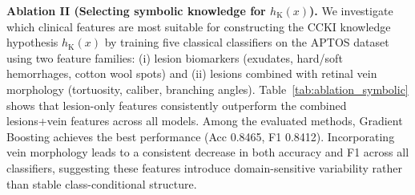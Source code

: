 \documentclass[runningheads]{llncs}
\begin{document}
\noindent\textbf{Ablation II (Selecting symbolic knowledge for $h_{\mathrm{K}}(x)$).}
\label{ablation_study1}
We investigate which clinical features are most suitable for constructing the CCKI knowledge hypothesis $h_{\mathrm{K}}(x)$ by training five classical classifiers on the APTOS dataset using two feature families: (i) lesion biomarkers (exudates, hard/soft hemorrhages, cotton wool spots) and (ii) lesions combined with retinal vein morphology (tortuosity, caliber, branching angles). Table~\ref{tab:ablation_symbolic} shows that lesion-only features consistently outperform the combined lesions+vein features across all models. Among the evaluated methods, Gradient Boosting achieves the best performance (Acc 0.8465, F1 0.8412). Incorporating vein morphology leads to a consistent decrease in both accuracy and F1 across all classifiers, suggesting these features introduce domain-sensitive variability rather than stable class-conditional structure.
\end{document}
